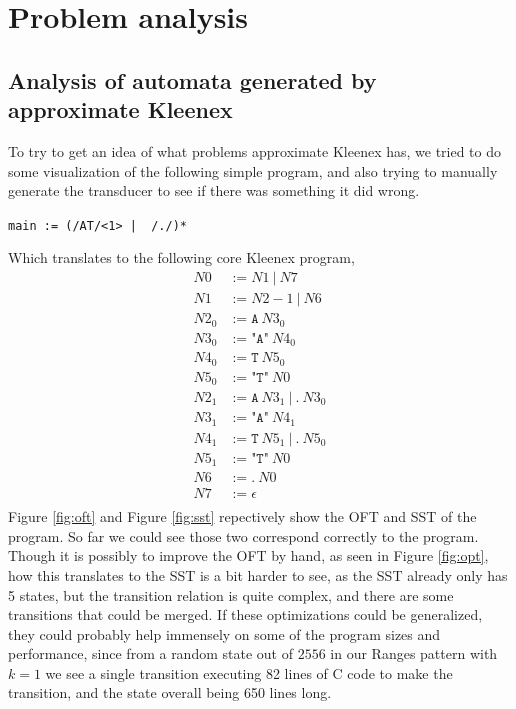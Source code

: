 \section{Problem analysis}

\subsection{Analysis of automata generated by approximate Kleenex}
To try to get an idea of what problems approximate Kleenex has, we tried to do
some visualization of the following simple program, and also
trying to manually generate the transducer to see if there was something it did
wrong.
\begin{center}
    \texttt{main := (/AT/<1> | ~/./)*}
\end{center}

Which translates to the following core Kleenex program,
\begin{align*}
    N0      &:= N1\ |\ N7\\
    N1      &:= N2-1\ |\ N6\\
    N2_0    &:= \texttt{A}\ N3_0\\
    N3_0    &:= \texttt{"A"}\ N4_0\\
    N4_0    &:= \texttt{T}\ N5_0\\
    N5_0    &:= \texttt{"T"}\ N0\\
    N2_1    &:= \texttt{A}\ N3_1\ |\ \texttt{.}\ N3_0\\
    N3_1    &:= \texttt{"A"}\ N4_1\\
    N4_1    &:= \texttt{T}\ N5_1\ |\ \texttt{.}\ N5_0\\
    N5_1    &:= \texttt{"T"}\ N0\\
    N6      &:= \texttt{.}\ N0\\
    N7      &:= \epsilon\\
\end{align*}
Figure \ref{fig:oft} and Figure \ref{fig:sst} repectively show the OFT and SST
of the program. So far we could see those two correspond correctly to the
program. Though it is possibly to improve the OFT by hand, as seen in Figure
\ref{fig:opt}, how this translates to the SST is a bit harder to see, as the
SST already only has 5 states, but the transition relation is quite complex,
and there are some transitions that could be merged. If these optimizations
could be generalized, they could probably help immensely on some of the program
sizes and performance, since from a random state out of $2556$ in our Ranges
pattern with $k = 1$ we see a single transition executing 82 lines of C code to
make the transition, and the state overall being 650 lines long.

